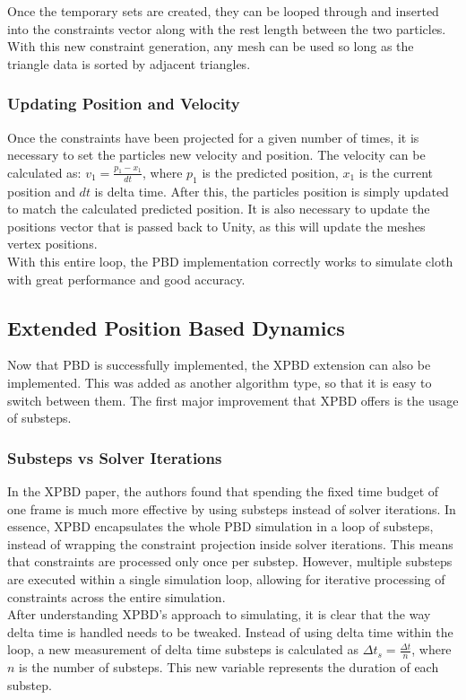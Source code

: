 \documentclass[12pt,a4paper]{article}
\begin{document}
Once the temporary sets are created, they can be looped through and inserted into the constraints vector along with the rest length between the two particles. With this new constraint generation, any mesh can be used so long as the triangle data is sorted by adjacent triangles.
\subsubsection{Updating Position and Velocity}
Once the constraints have been projected for a given number of times, it is necessary to set the particles new velocity and position. The velocity can be calculated as: $v_1=\frac{p_1-x_1}{dt}$, where $p_1$ is the predicted position, $x_1$ is the current position and $dt$ is delta time. After this, the particles position is simply updated to match the calculated predicted position. It is also necessary to update the positions vector that is passed back to Unity, as this will update the meshes vertex positions. \\

With this entire loop, the PBD implementation correctly works to simulate cloth with great performance and good accuracy. 
	
\subsection{Extended Position Based Dynamics}
Now that PBD is successfully implemented, the XPBD extension can also be implemented. This was added as another algorithm type, so that it is easy to switch between them. The first major improvement that XPBD offers is the usage of substeps.
\subsubsection{Substeps vs Solver Iterations}
In the XPBD paper, the authors found that spending the fixed time budget of one frame is much more effective by using substeps instead of solver iterations. In essence, XPBD encapsulates the whole PBD simulation in a loop of substeps, instead of wrapping the constraint projection inside solver iterations. This means that constraints are processed only once per substep. However, multiple substeps are executed within a single simulation loop, allowing for iterative processing of constraints across the entire simulation. \\

After understanding XPBD's approach to simulating, it is clear that the way delta time is handled needs to be tweaked. Instead of using delta time within the loop, a new measurement of delta time substeps is calculated as ${\Delta}t_s=\frac{{\Delta}t}{n}$, where $n$ is the number of substeps. This new variable represents the duration of each substep. \\
\end{document}
